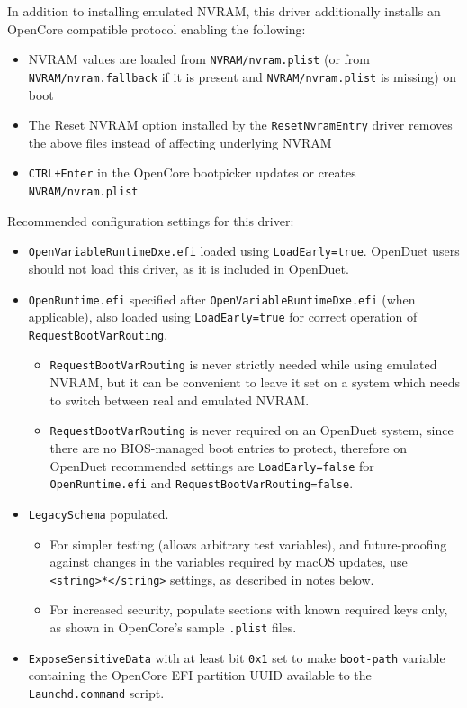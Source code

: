 \documentclass[]{article}
\providecommand{\tightlist}{%
  \setlength{\itemsep}{0pt}\setlength{\parskip}{0pt}}
\begin{document}
In addition to installing emulated NVRAM, this driver additionally installs an OpenCore compatible
protocol enabling the following:

\begin{itemize}
\tightlist
  \item NVRAM values are loaded from \texttt{NVRAM/nvram.plist} (or from \texttt{NVRAM/nvram.fallback}
  if it is present and \texttt{NVRAM/nvram.plist} is missing) on boot
  \item The Reset NVRAM option installed by the \texttt{ResetNvramEntry} driver removes the above files instead
  of affecting underlying NVRAM
  \item \texttt{CTRL+Enter} in the OpenCore bootpicker updates or creates \texttt{NVRAM/nvram.plist}
\end{itemize}

Recommended configuration settings for this driver:

\begin{itemize}
\tightlist
  \item \texttt{OpenVariableRuntimeDxe.efi} loaded using \texttt{LoadEarly=true}. OpenDuet users
  should not load this driver, as it is included in OpenDuet.
  \item \texttt{OpenRuntime.efi} specified after \texttt{OpenVariableRuntimeDxe.efi} (when applicable),
  also loaded using \texttt{LoadEarly=true} for correct operation of \texttt{RequestBootVarRouting}.
  \begin{itemize}
  \tightlist
    \item \texttt{RequestBootVarRouting} is never strictly needed while using emulated NVRAM, but
    it can be convenient to leave it set on a system which needs to switch between real and emulated NVRAM.
    \item \texttt{RequestBootVarRouting} is never required on an OpenDuet system, since there are
    no BIOS-managed boot entries to protect, therefore on OpenDuet recommended settings are
    \texttt{LoadEarly=false} for \texttt{OpenRuntime.efi} and \texttt{RequestBootVarRouting=false}.
  \end{itemize}
  \item \texttt{LegacySchema} populated.
  \begin{itemize}
  \tightlist
    \item For simpler testing (allows arbitrary test variables), and future-proofing against
    changes in the variables required by macOS updates, use \texttt{<string>*</string>} settings, as
    described in notes below.
    \item For increased security, populate sections with known required keys only, as shown in OpenCore's
    sample \texttt{.plist} files.
  \end{itemize}
  \item \texttt{ExposeSensitiveData} with at least bit \texttt{0x1} set to make \texttt{boot-path}
  variable containing the OpenCore EFI partition UUID available to the \texttt{Launchd.command} script.
\end{itemize}
\end{document}
